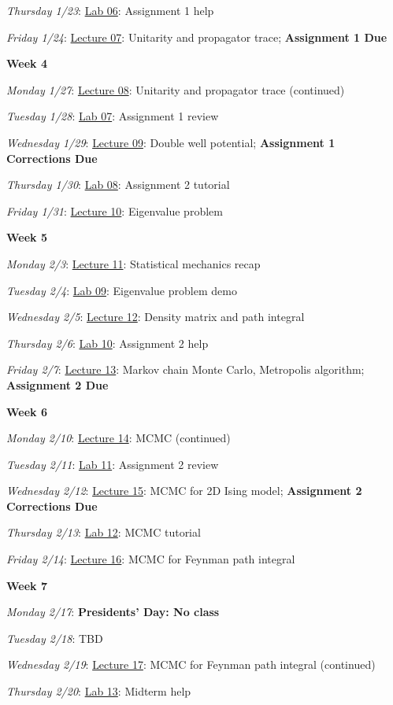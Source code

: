 \documentclass[12pt]{article}
\begin{document}
\emph{Thursday 1/23}: \underline{Lab 06}: Assignment 1 help

\emph{Friday 1/24}: \underline{Lecture 07}: Unitarity and propagator trace; \textbf{Assignment 1 Due}

\noindent\textbf{Week 4}

\emph{Monday 1/27}: \underline{Lecture 08}: Unitarity and propagator trace (continued)

\emph{Tuesday 1/28}: \underline{Lab 07}: Assignment 1 review

\emph{Wednesday 1/29}: \underline{Lecture 09}: Double well potential; \textbf{Assignment 1 Corrections Due}

\emph{Thursday 1/30}: \underline{Lab 08}: Assignment 2 tutorial

\emph{Friday 1/31}: \underline{Lecture 10}: Eigenvalue problem

\noindent\textbf{Week 5}

\emph{Monday 2/3}: \underline{Lecture 11}: Statistical mechanics recap

\emph{Tuesday 2/4}: \underline{Lab 09}: Eigenvalue problem demo

\emph{Wednesday 2/5}: \underline{Lecture 12}: Density matrix and path integral

\emph{Thursday 2/6}: \underline{Lab 10}: Assignment 2 help

\emph{Friday 2/7}: \underline{Lecture 13}: Markov chain Monte Carlo, Metropolis algorithm; \textbf{Assignment 2 Due}

\noindent\textbf{Week 6}

\emph{Monday 2/10}: \underline{Lecture 14}: MCMC (continued)

\emph{Tuesday 2/11}: \underline{Lab 11}: Assignment 2 review

\emph{Wednesday 2/12}: \underline{Lecture 15}: MCMC for 2D Ising model; \textbf{Assignment 2 Corrections Due}

\emph{Thursday 2/13}: \underline{Lab 12}: MCMC tutorial

\emph{Friday 2/14}: \underline{Lecture 16}: MCMC for Feynman path integral

\noindent\textbf{Week 7}

\emph{Monday 2/17}: \textbf{Presidents' Day: No class}

\emph{Tuesday 2/18}: TBD

\emph{Wednesday 2/19}: \underline{Lecture 17}: MCMC for Feynman path integral (continued)

\emph{Thursday 2/20}: \underline{Lab 13}: Midterm help
\end{document}
